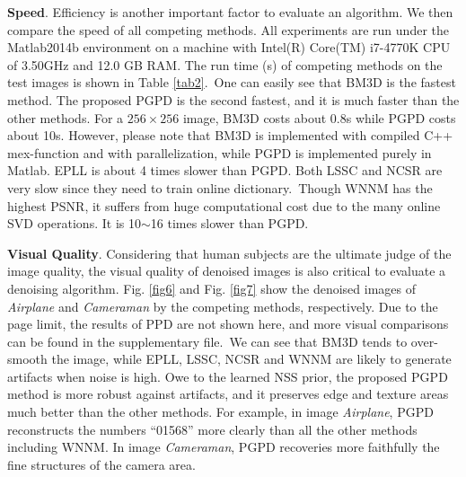 \textbf{Speed}. Efficiency is another important factor to evaluate an algorithm. We then compare the speed of all competing methods. All experiments are run under the Matlab2014b environment on a machine with Intel(R) Core(TM) i7-4770K CPU of 3.50GHz and 12.0 GB RAM. The run time (s) of competing methods on the test images is shown in Table \ref{tab2}.\ One can easily see that BM3D is the fastest method. The proposed PGPD is the second fastest, and it is much faster than the other methods. For a $256\times256$ image, BM3D costs about 0.8s while PGPD costs about 10s. However, please note that BM3D is implemented with compiled C++ mex-function and with parallelization, while PGPD is implemented purely in Matlab. EPLL is about 4 times slower than PGPD. Both LSSC and NCSR are very slow since they need to train online dictionary.\ Though WNNM has the highest PSNR, it suffers from huge computational cost due to the many online SVD operations. It is 10$\sim$16 times slower than PGPD. 

\textbf{Visual Quality}. Considering that human subjects are the ultimate judge of the image quality, the visual quality of denoised images is also critical to evaluate a denoising algorithm. Fig. \ref{fig6} and Fig. \ref{fig7} show the denoised images of \textsl{Airplane} and \textsl{Cameraman} by the competing methods, respectively. Due to the page limit, the results of PPD are not shown here, and more visual comparisons can be found in the supplementary file.\ We can see that BM3D tends to over-smooth the image, while EPLL, LSSC, NCSR and WNNM are likely to generate artifacts when noise is high. Owe to the learned NSS prior, the proposed PGPD method is more robust against artifacts, and it preserves edge and texture areas much better than the other methods. For example, in image \textsl{Airplane}, PGPD reconstructs the numbers ``01568'' more clearly than all the other methods including WNNM. In image \textsl{Cameraman}, PGPD recoveries more faithfully the fine structures of the camera area. 

